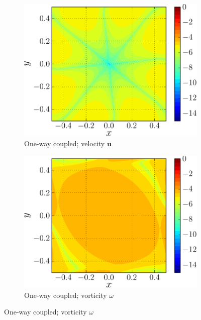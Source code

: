 \begin{figure}[h]
     \begin{subfigure}[t]{0.45\textwidth}
             \includegraphics[width=\linewidth]{./figures/hybrid/lambOseent2/lambOseen_oneway_vErrorFinal_compressed-crop.pdf}
             \caption{One-way coupled; velocity $\mathbf{u}$}
             \label{fig:lambOseen_oneway_vErrorFinal}
     \end{subfigure}
     \qquad
     \begin{subfigure}[t]{0.45\textwidth}
             \includegraphics[width=\linewidth]{./figures/hybrid/lambOseent2/lambOseen_oneway_wErrorFinal_compressed-crop.pdf}
             \caption{One-way coupled; vorticity $\omega$}
             \label{fig:lambOseen_oneway_wErrorFinal}
     \end{subfigure}     
   

\end{figure}
